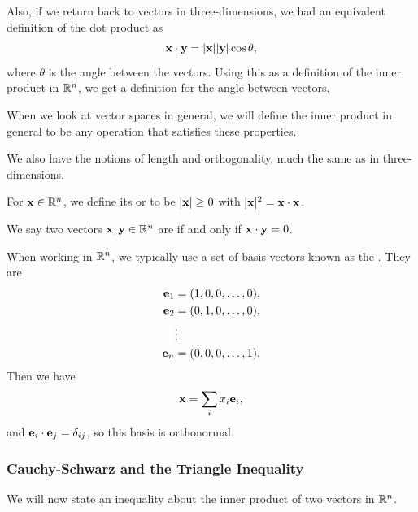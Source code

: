 \documentclass[a4paper]{scrartcl}
\begin{document}
Also, if we return back to vectors in three-dimensions, we had an equivalent definition of the dot product as
$$
\mathbf{x} \cdot \mathbf{y} = |\mathbf{x}| |\mathbf{y}| \cos \theta,
$$
where $\theta$ is the angle between the vectors. Using this as a definition of the inner product in $\mathbb{R}^n$, we get a definition for the angle between vectors.

When we look at vector spaces in general, we will define the inner product in general to be any operation that satisfies these properties.

We also have the notions of length and orthogonality, much the same as in three-dimensions.

\begin{definition}
    For $\mathbf{x} \in \mathbb{R}^n$, we define its  or  to be $|\mathbf{x}| \geq 0$ with $|\mathbf{x}|^2 = \mathbf{x} \cdot \mathbf{x}$.
\end{definition}

\begin{definition}[Orthogonality]
    We say two vectors $\mathbf{x}, \mathbf{y} \in \mathbb{R}^n$ are  if and only if $\mathbf{x} \cdot \mathbf{y} = 0$.
\end{definition}

When working in $\mathbb{R}^n$, we typically use a set of basis vectors known as the . They are
\begin{align*}
    \mathbf{e}_1 &= (1, 0, 0, \dots, 0), \\
    \mathbf{e}_2 &= (0, 1, 0, \dots, 0), \\
        &\vdots \\
        \mathbf{e}_n &= (0, 0, 0, \dots, 1).
\end{align*}
Then we have
$$
\mathbf{x} = \sum_i x_i \mathbf{e}_i,
$$
and $\mathbf{e}_i \cdot \mathbf{e}_j = \delta_{ij}$, so this basis is orthonormal.

\subsubsection{Cauchy-Schwarz and the Triangle Inequality}

We will now state an inequality about the inner product of two vectors in $\mathbb{R}^n$.
\end{document}
